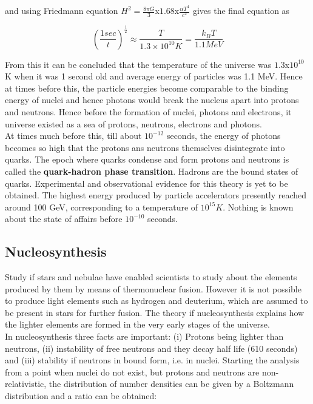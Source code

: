 and using Friedmann equation $H^2 = \frac{8{\pi}G}{3}$x$1.68$x${\frac{{\alpha}T^4}{c^2}}$ gives the final equation as

\begin{equation}
    (\frac{1 sec}{t})^{\frac{1}{2}} \approx \frac{T}{1.3 \times 10^10 K} = \frac{{k_B}T}{1.1 MeV}
\end{equation}

From this it can be concluded that the temperature of the universe was $1.3$x$10^10$ K when it was 1 second old and average energy of particles was 1.1 MeV. Hence at times before this, the particle energies become comparable to the binding energy of nuclei and hence photons would break the nucleus apart into protons and neutrons. Hence before the formation of nuclei, photons and electrons, it universe existed as a sea of protons, neutrons, electrons and photons. 
\\
At times much before this, till about $10^{-12}$ seconds, the energy of photons becomes so high that the protons ans neutrons themselves disintegrate into quarks. The epoch where quarks condense and form protons and neutrons is called the \textbf{quark-hadron phase transition}. Hadrons are the bound states of quarks. Experimental and observational evidence for this theory is yet to be obtained.
The highest energy produced by particle accelerators presently reached around 100 GeV, corresponding to a temperature of $10^15 K$. Nothing is known about the state of affairs before $10^{-10}$ seconds.

\subsection{Nucleosynthesis}
Study if stars and nebulae have enabled scientists to study about the elements produced by them by means of thermonuclear fusion. However it is not possible to produce light elements such as hydrogen and deuterium, which are assumed to be present in stars for further fusion. The theory if nucleosynthesis explains how the lighter elements are formed in the very early stages of the universe.
\\
In nucleosynthesis three facts are important: (i) Protons being lighter than neutrons, (ii) instability of free neutrons and they decay half life (610 seconds) and (iii) stability if neutrons in bound form, i.e. in nuclei. Starting the analysis from a point when nuclei do not exist, but protons and neutrons are non-relativistic, the distribution of number densities can be given by a Boltzmann distribution and a ratio can be obtained:

